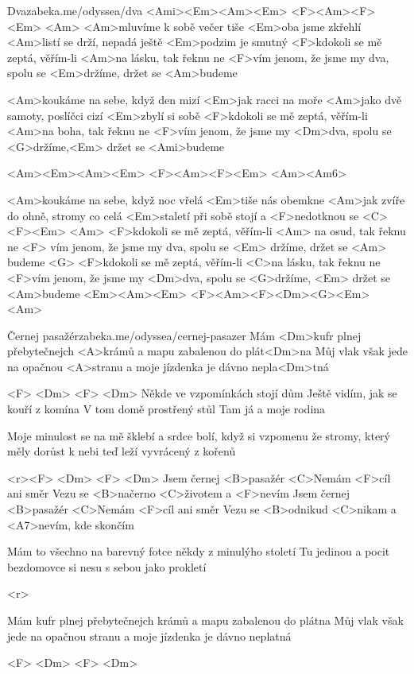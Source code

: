 \begin{song}[Zrní]{13}{Dva}{zabeka.me/odyssea/dva}
<Ami><Em><Am><Em>
<F><Am><F><Em>
<Am>
<Am>mluvíme k sobě večer tiše
<Em>oba jsme zkřehlí
<Am>listí se drží, nepadá ještě
<Em>podzim je smutný
<F>kdokoli se mě zeptá, věřím-li <Am>na lásku, tak řeknu ne
<F>vím jenom, že jsme my dva, spolu se <Em>držíme,
držet se <Am>budeme


<Am>koukáme na sebe, když den mizí
<Em>jak racci na moře
<Am>jako dvě samoty, poslíčci cizí
<Em>zbylí si sobě
<F>kdokoli se mě zeptá, věřím-li <Am>na boha, tak řeknu ne
<F>vím jenom, že jsme my <Dm>dva, spolu se <G>držíme,<Em>
držet se <Ami>budeme

<Am><Em><Am><Em>
<F><Am><F><Em>
<Am><Am6>


<Am>koukáme na sebe, když noc vřelá
<Em>tiše nás obemkne
<Am>jak zvíře do ohně, stromy co celá
<Em>staletí při sobě stojí a <F>nedotknou se <C><F><Em>
<Am>
<F>kdokoli se mě zeptá, věřím-li <Am> na osud, tak řeknu ne
<F> vím jenom, že jsme my dva, spolu se <Em> držíme,
držet se <Am> budeme <G>
<F>kdokoli se mě zeptá, věřím-li <C>na lásku, tak řeknu ne
<F>vím jenom, že jsme my <Dm>dva, spolu se <G>držíme,
<Em> držet se <Am>budeme <Em><Am><Em>
<F><Am><F><Dm><G><Em>
<Am>
\end{song}
\begin{song}[Traband]{14}{Černej pasažér}{zabeka.me/odyssea/cernej-pasazer}
Mám <Dm>kufr plnej přebytečnejch <A>krámů 
a mapu zabalenou do plát<Dm>na 
Můj vlak však jede na opačnou <A>stranu 
a moje jízdenka je dávno nepla<Dm>tná 

<F> <Dm> <F> <Dm>
Někde ve vzpomínkách stojí dům 
Ještě vidím, jak se kouří z komína 
V tom domě prostřený stůl 
Tam já a moje rodina 

Moje minulost se na mě šklebí 
a srdce bolí, když si vzpomenu 
že stromy, který měly dorůst k nebi 
teď leží vyvrácený z kořenů 

<r><F> <Dm> <F> <Dm>
Jsem černej <B>pasažér 
<C>Nemám <F>cíl ani směr 
Vezu se <B>načerno <C>životem a <F>nevím 
Jsem černej <B>pasažér 
<C>Nemám <F>cíl ani směr 
Vezu se <B>odnikud <C>nikam a <A7>nevím, kde skončím 

Mám to všechno na barevný fotce 
někdy z minulýho století 
Tu jedinou a pocit bezdomovce 
si nesu s sebou jako prokletí 

<r>

Mám kufr plnej přebytečnejch krámů 
a mapu zabalenou do plátna 
Můj vlak však jede na opačnou stranu 
a moje jízdenka je dávno neplatná 

<F> <Dm> <F> <Dm>

\end{song}
